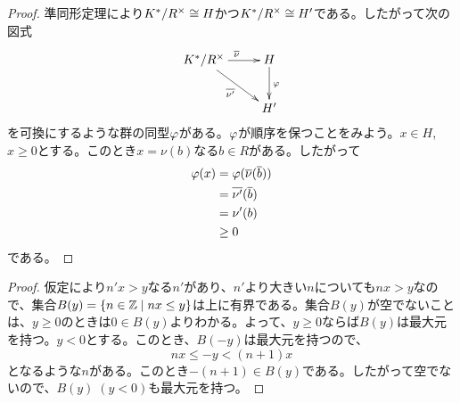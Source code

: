 \begin{proof}
  準同形定理により$K^* / R^{\times} \cong H$かつ$K^* / R^{\times} \cong H'$である。したがって次の図式
  \[
  \xymatrix{
  K^*/ R^{\tm} \ar[r]^{\ol{\nu} } \ar[dr]_{\ol{\nu'}} & H \ar[d]^{\vp} \\
  {} & H'
  }
  \]
を可換にするような群の同型${\varphi}$がある。${\varphi}$が順序を保つことをみよう。$x \in H$, $x \geq 0$とする。このとき$x = \nu(b)$なる$b \in R$がある。したがって
\begin{align*}
  {\varphi}(x) &= {\varphi}(\overline{\nu}(\overline{b}) ) \\
  &= \overline{\nu'}(\overline{b}) \\
  &= \nu'(b) \\
  &\geq 0
\end{align*}
である。

\end{proof}



\begin{proof}
  仮定により$n' x > y$なる$n'$があり、$n'$より大きい$n$についても$nx>y$なので、集合$B(y) = \left\{ n \in {\mathbb Z} \mathrel{} \middle| \mathrel{} nx \leq y \right\}$は上に有界である。集合$B(y)$が空でないことは、$y \geq 0$のときは$0 \in B(y)$よりわかる。よって、$y \geq 0$ならば$B(y)$は最大元を持つ。$y < 0$とする。このとき、$B(-y)$は最大元を持つので、
  \[
  nx \leq -y < (n+1)x
  \]
  となるような$n$がある。このとき$-(n+1) \in B(y)$である。したがって空でないので、$B(y) \; (y<0)$も最大元を持つ。
\end{proof}


